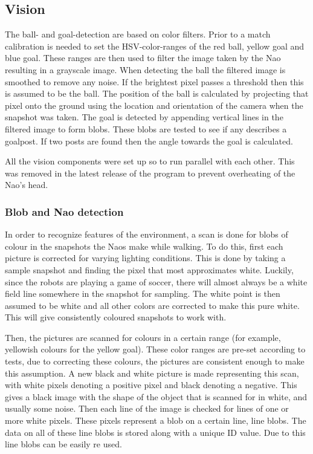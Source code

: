 \documentclass[11pt,a4paper,oneside]{article}
\begin{document}
\subsection{Vision}
\label{sec:vision}
The ball- and goal-detection are based on color filters. Prior to a match calibration is needed to set the HSV-color-ranges of the red ball, yellow goal and blue goal. These ranges are then used to filter the image taken by the Nao resulting in a grayscale image. When detecting the ball the filtered image is smoothed to remove any noise. If the brightest pixel passes a threshold then this is assumed to be the ball. The position of the ball is calculated by projecting that pixel onto the ground using the location and orientation of the camera when the snapshot was taken. The goal is detected by appending vertical lines in the filtered image to form blobs. These blobs are tested to see if any describes a goalpost. If two posts are found then the angle towards the goal is calculated.

All the vision components were set up so to run parallel with each other. This was removed in the latest release of the program to prevent overheating of the Nao's head.  

\subsubsection{Blob and Nao detection}
In order to recognize features of the environment, a scan is done for blobs of colour in the snapshots the Naos make while walking. To do this, first each picture is corrected for varying lighting conditions. This is done by taking a sample snapshot and finding the pixel that most approximates white. Luckily, since the robots are playing a game of soccer, there will almost always be a white field line somewhere in the snapshot for sampling. The white point is then assumed to be white and all other colors are corrected to make this pure white. This will give consistently coloured snapshots to work with.

Then, the pictures are scanned for colours in a certain range (for example, yellowish colours for the yellow goal). These color ranges are pre-set according to tests, due to correcting these colours, the pictures are consistent enough to make this assumption. A new black and white picture is made representing this scan, with white pixels denoting a positive pixel and black denoting a negative. This gives a black image with the shape of the object that is scanned for in white, and usually some noise. Then each line of the image is checked for lines of one or more white pixels. These pixels represent a blob on a certain line, line blobs. The data on all of these line blobs is stored along with a unique ID value. Due to this line blobs can be easily re used.
\end{document}
